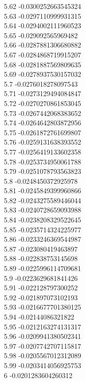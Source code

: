 {5.62	-0.0300252663545324\\
5.63	-0.0297110999931315\\
5.64	-0.0294002111960523\\
5.65	-0.029092565969482\\
5.66	-0.0287881306680882\\
5.67	-0.0284868719915207\\
5.68	-0.0281887569809635\\
5.69	-0.0278937530157032\\
5.7	-0.0276018278097543\\
5.71	-0.0273129494084847\\
5.72	-0.0270270861853045\\
5.73	-0.0267442068383652\\
5.74	-0.0264642803872956\\
5.75	-0.0261872761699807\\
5.76	-0.0259131638393552\\
5.77	-0.0256419133602358\\
5.78	-0.0253734950061788\\
5.79	-0.0251078793563823\\
5.8	-0.0248450372925978\\
5.81	-0.0245849399960866\\
5.82	-0.0243275589446044\\
5.83	-0.0240728659093988\\
5.84	-0.0238208329522645\\
5.85	-0.0235714324225977\\
5.86	-0.0233246369544987\\
5.87	-0.023080419463897\\
5.88	-0.022838753145698\\
5.89	-0.0225996114709681\\
5.9	-0.0223629681841426\\
5.91	-0.022128797300252\\
5.92	-0.021897073102193\\
5.93	-0.0216677701380125\\
5.94	-0.02144086321822\\
5.95	-0.0212163274131317\\
5.96	-0.0209941380502341\\
5.97	-0.0207742707115817\\
5.98	-0.0205567012312089\\
5.99	-0.0203414056925753\\
6	-0.0201283604260312\\
}
